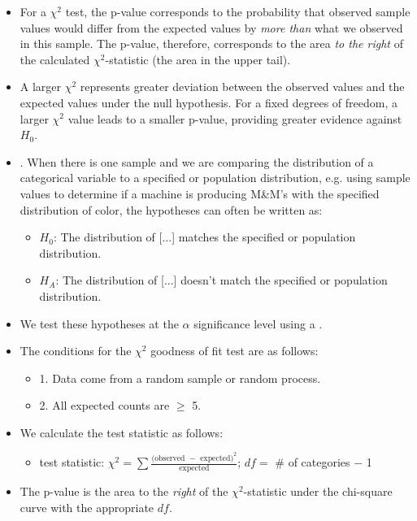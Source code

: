\begin{itemize}
\item For a $\chi^2$ test, the p-value corresponds to the probability that observed sample values would differ from the expected values by \textit{more than} what we observed in this sample.  The p-value, therefore, corresponds to the area \textit{to the right} of the calculated $\chi^2$-statistic (the area in the upper tail). 
\item A larger $\chi^2$ represents greater deviation between the observed values and the expected values under the null hypothesis.  For a fixed degrees of freedom, a larger $\chi^2$ value leads to a smaller p-value, providing greater evidence against $H_0$. 

\item {}.  When there is one sample and we are comparing the distribution of a categorical variable to a specified or population distribution, e.g. using sample values to determine if a machine is producing M\&M's with the specified distribution of color, the hypotheses can often be written as:
\begin{itemize}
\item[] $H_0$: The distribution of [...] matches the specified or population distribution. 
\item[] $H_A$: The distribution of [...] doesn't match the specified or population distribution. 
\end{itemize}

\item[] We test these hypotheses at the $\alpha$ significance level using a .\\
\item The conditions for the $\chi^2$ goodness of fit test are as follows:
\begin{itemize}
\item[] 1.  Data come from a random sample or random process.
\item[] 2.  All expected counts are $\ge$ 5.
\end{itemize}

\D{\newpage}

\item We calculate the test statistic as follows:
\begin{itemize}
\item[] test statistic:  $\chi^2 =\sum{ \frac{\text{(observed } - \text{ expected})^2}{\text{expected}}}$; \quad \quad $df =$ \# of categories $-$ 1
\end{itemize}
\item The p-value is the area to the \emph{right} of the $\chi^2$-statistic under the chi-square curve with the appropriate $df$.

\end{itemize}


